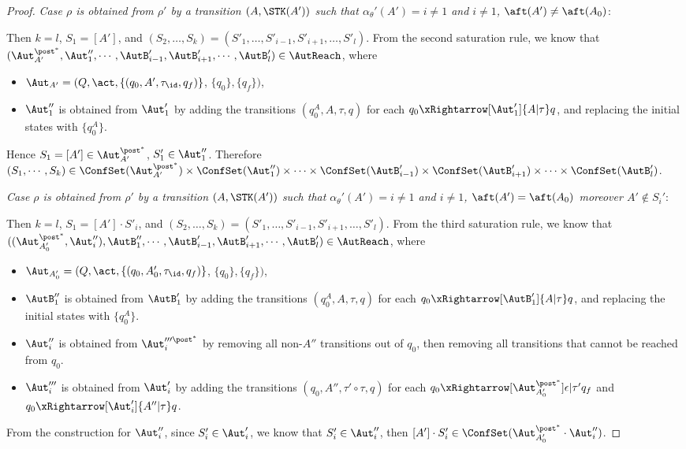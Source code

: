 \begin{proof}
\noindent \emph{Case $\rho$ is obtained from $\rho'$ by a transition $(A,\STK(A'))$ such that $\alpha_\theta'(A')=i\neq1$ and $i\neq 1$, $\aft(A')\neq\aft(A_0)$}: 

Then $k = l$, $S_1 = [A']$, and $(S_2, \dots, S_k) = (S'_1, \dots, S'_{i-1}, S'_{i+1}, \dots, S'_l)$. From the second saturation rule, we know that $(\Aut_{A'}^{\post^*},\Aut_{1}'',\cdots,\AutB_{i-1}',\AutB_{i+1}',\cdots,\AutB_{l}')\in\AutReach$, where
    \begin{itemize}
        \item $\Aut_{A'} = (Q, \act, \{(q_0, A', \tau_{\id}, q_f)\}$, $\{q_0\},\{q_f\})$,
        \item $\Aut_1''$ is obtained from $\Aut_1'$ by adding the transitions $(q_0^{A},A,\tau,q)$ for each $q_0\xRightarrow[\Aut_1']{A | \tau} q$, and replacing the initial states with $\{q_0^{A}\}$.
    \end{itemize}
        Hence $S_1=[A']\in\Aut_{A'}^{\post^*}$, $S_1'\in\Aut_1''$. Therefore $(S_1,\cdots,S_k)\in\ConfSet(\Aut_{A'}^{\post^*})\times\ConfSet(\Aut_1'')\times\cdots\times\ConfSet(\AutB_{i-1}')\times\ConfSet(\AutB_{i+1}')\times\cdots\times\ConfSet(\AutB_{l}')$.

        \noindent \emph{Case $\rho$ is obtained from $\rho'$ by a transition $(A,\STK(A'))$ such that $\alpha_\theta'(A')=i\neq1$ and $i\neq 1$, $\aft(A')=\aft(A_0)$ moreover $A'\notin S_i'$}:

        Then $k = l$, $S_1 = [A']\cdot S'_i$, and $(S_2, \dots, S_k) = (S'_1, \dots, S'_{i-1}, S'_{i+1}, \dots, S'_l)$. From the third saturation rule, we know that $((\Aut_{A_0'}^{\post^*},\Aut_{i}''),\AutB_{1}'',\cdots,\AutB_{i-1}',\AutB_{i+1}',\cdots,\AutB_{l}')\in\AutReach$, where
        \begin{itemize}
            \item $\Aut_{A_0'} = (Q, \act, \{(q_0, A_0', \tau_{\id}, q_f)\}$, $\{q_0\},\{q_f\})$,
            \item $\AutB_1''$ is obtained from $\AutB_1'$ by adding the transitions $(q_0^{A},A,\tau,q)$ for each $q_0\xRightarrow[\AutB_1']{A | \tau} q$, and replacing the initial states with $\{q_0^{A}\}$.
            \item $\Aut_i''$ is obtained from $\Aut_i'''^{\post^*}$ by removing all non-$A''$ transitions out of $q_0$, then removing all transitions that cannot be reached from $q_0$.
            \item $\Aut_i'''$ is obtained from $\Aut_i'$ by adding the transitions $(q_0,A'',\tau'\circ\tau,q)$ for each $q_0\xRightarrow[\Aut_{A_0'}^{\post^*}]{\epsilon | \tau'} q_f$ and $q_0 \xRightarrow[\Aut_i']{A'' | \tau} q$.
        \end{itemize}
        From the construction for $\Aut_i''$, since $S_i'\in\Aut_{i}'$, we know that $S_i'\in\Aut_{i}''$, then $[A']\cdot S_i'\in\ConfSet(\Aut_{A_0'}^{\post^*}\cdot\Aut_{i}'')$.


\end{proof}
